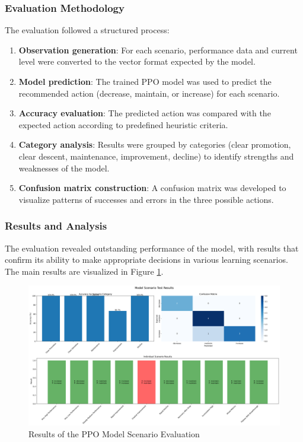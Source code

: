 \subsubsection{Evaluation Methodology}

The evaluation followed a structured process:

\begin{enumerate}
    \item \textbf{Observation generation}: For each scenario, performance data and current level were converted to the vector format expected by the model.
    
    \item \textbf{Model prediction}: The trained PPO model was used to predict the recommended action (decrease, maintain, or increase) for each scenario.
    
    \item \textbf{Accuracy evaluation}: The predicted action was compared with the expected action according to predefined heuristic criteria.
    
    \item \textbf{Category analysis}: Results were grouped by categories (clear promotion, clear descent, maintenance, improvement, decline) to identify strengths and weaknesses of the model.
    
    \item \textbf{Confusion matrix construction}: A confusion matrix was developed to visualize patterns of successes and errors in the three possible actions.
\end{enumerate}

\subsubsection{Results and Analysis}

The evaluation revealed outstanding performance of the model, with results that confirm its ability to make appropriate decisions in various learning scenarios. The main results are visualized in Figure \ref{fig:ppo-evaluation}.

\begin{figure}[h]
    \centering
    \includegraphics[width=\textwidth]{figuras/ppo-evaluation.png}
    \caption{Results of the PPO Model Scenario Evaluation}
    \label{fig:ppo-evaluation}
\end{figure}

